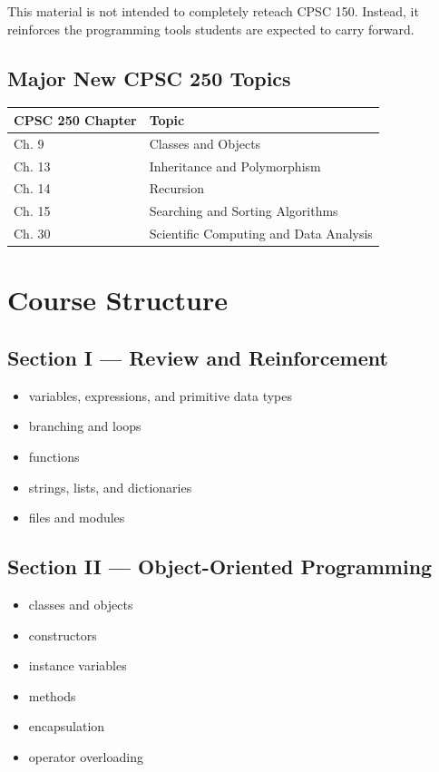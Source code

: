 \documentclass[11pt]{article}
\begin{document}
\noindent
This material is not intended to completely reteach CPSC 150. Instead, it reinforces the programming tools students are expected to carry forward.

\subsection*{\color{oopBlue}Major New CPSC 250 Topics}

\begin{center}
\renewcommand{\arraystretch}{1.25}
\begin{tabular}{p{} p{}}
\toprule
\textbf{CPSC 250 Chapter} & \textbf{Topic} \\
\midrule
Ch. 9 & Classes and Objects \\
Ch. 13 & Inheritance and Polymorphism \\
Ch. 14 & Recursion \\
Ch. 15 & Searching and Sorting Algorithms \\
Ch. 30 & Scientific Computing and Data Analysis \\
\bottomrule
\end{tabular}
\end{center}

\section{Course Structure}

\subsection*{\color{reviewGreen}Section I --- Review and Reinforcement}

\begin{itemize}
    \item variables, expressions, and primitive data types
    \item branching and loops
    \item functions
    \item strings, lists, and dictionaries
    \item files and modules
\end{itemize}

\subsection*{\color{oopBlue}Section II --- Object-Oriented Programming}

\begin{itemize}
    \item classes and objects
    \item constructors
    \item instance variables
    \item methods
    \item encapsulation
    \item operator overloading
\end{itemize}
\end{document}
